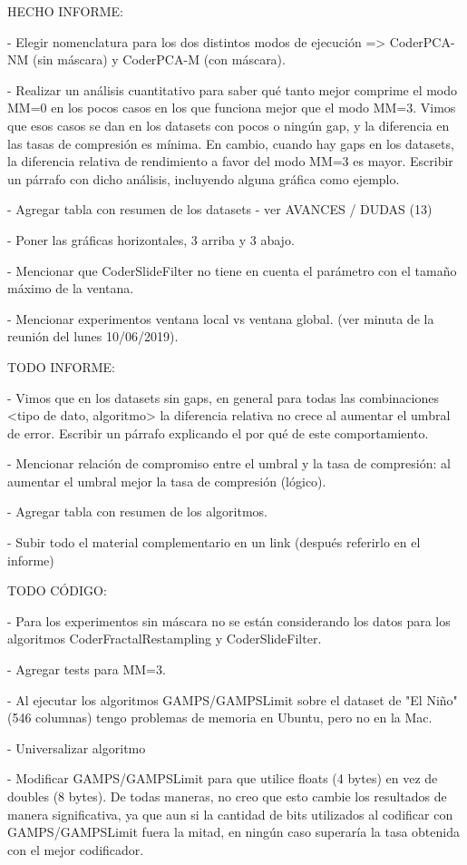 \clearpage

HECHO INFORME:

- Elegir nomenclatura para los dos distintos modos de ejecución => CoderPCA-NM (sin máscara) y CoderPCA-M (con máscara).

- Realizar un análisis cuantitativo para saber qué tanto mejor comprime el modo MM=0 en los pocos casos en los que funciona mejor que el modo MM=3. Vimos que esos casos se dan en los datasets con pocos o ningún gap, y la diferencia en las tasas de compresión es mínima. En cambio, cuando hay gaps en los datasets, la diferencia relativa de rendimiento a favor del modo MM=3 es mayor. Escribir un párrafo con dicho análisis, incluyendo alguna gráfica como ejemplo.

- Agregar tabla con resumen de los datasets - ver AVANCES / DUDAS (13)

- Poner las gráficas horizontales, 3 arriba y 3 abajo.

- Mencionar que CoderSlideFilter no tiene en cuenta el parámetro con el tamaño máximo de la ventana.

- Mencionar experimentos ventana local vs ventana global. (ver minuta de la reunión del lunes 10/06/2019).

\vspace{+20pt}

TODO INFORME:

- Vimos que en los datasets sin gaps, en general para todas las combinaciones <tipo de dato, algoritmo> la diferencia relativa no crece al aumentar el umbral de error. Escribir un párrafo explicando el por qué de este comportamiento.

- Mencionar relación de compromiso entre el umbral y la tasa de compresión: al aumentar el umbral mejor la tasa de compresión (lógico).

- Agregar tabla con resumen de los algoritmos.

- Subir todo el material complementario en un link (después referirlo en el informe)

\clearpage

TODO CÓDIGO:

- Para los experimentos sin máscara no se están considerando los datos para los algoritmos CoderFractalRestampling y CoderSlideFilter.

- Agregar tests para MM=3.

- Al ejecutar los algoritmos GAMPS/GAMPSLimit sobre el dataset de "El Niño" (546 columnas) tengo problemas de memoria en Ubuntu, pero no en la Mac.

- Universalizar algoritmo

- Modificar GAMPS/GAMPSLimit para que utilice floats (4 bytes) en vez de doubles (8 bytes). De todas maneras, no creo que esto cambie los resultados de manera significativa, ya que aun si la cantidad de bits utilizados al codificar con GAMPS/GAMPSLimit fuera la mitad, en ningún caso superaría la tasa obtenida con el mejor codificador.